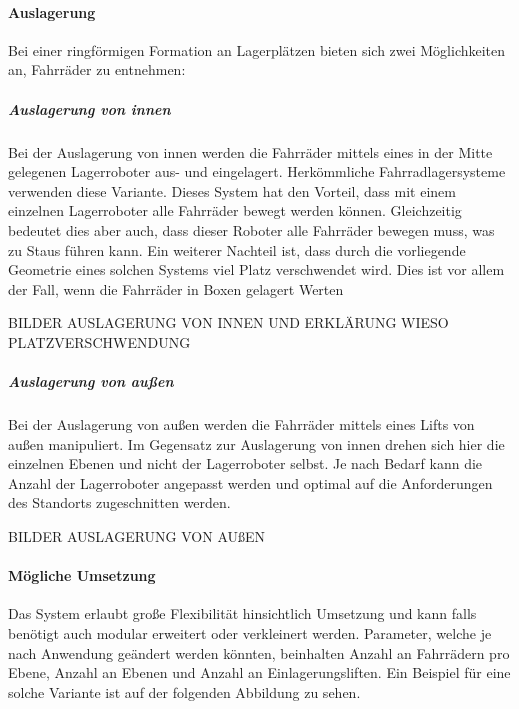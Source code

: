 \paragraph{Auslagerung} Bei einer ringförmigen Formation an Lagerplätzen bieten sich zwei Möglichkeiten an, Fahrräder zu entnehmen:

\subparagraph{Auslagerung von innen} Bei der Auslagerung von innen werden die Fahrräder mittels eines in der Mitte gelegenen Lagerroboter aus- und eingelagert. Herkömmliche Fahrradlagersysteme verwenden diese Variante. Dieses System hat den Vorteil, dass mit einem einzelnen Lagerroboter alle Fahrräder bewegt werden können. Gleichzeitig bedeutet dies aber auch, dass dieser Roboter alle Fahrräder bewegen muss, was zu Staus führen kann. Ein weiterer Nachteil ist, dass durch die vorliegende Geometrie eines solchen Systems viel Platz verschwendet wird. Dies ist vor allem der Fall, wenn die Fahrräder in Boxen gelagert Werten

BILDER AUSLAGERUNG VON INNEN UND ERKLÄRUNG WIESO PLATZVERSCHWENDUNG

\subparagraph{Auslagerung von außen} Bei der Auslagerung von außen werden die Fahrräder mittels eines Lifts von außen manipuliert. Im Gegensatz zur Auslagerung von innen drehen sich hier die einzelnen Ebenen und nicht der Lagerroboter selbst. Je nach Bedarf kann die Anzahl der Lagerroboter angepasst werden und optimal auf die Anforderungen des Standorts zugeschnitten werden.

BILDER AUSLAGERUNG VON AUßEN

\paragraph{Mögliche Umsetzung} Das System erlaubt große Flexibilität hinsichtlich Umsetzung und kann falls benötigt auch modular erweitert oder verkleinert werden. Parameter, welche je nach Anwendung geändert werden könnten, beinhalten Anzahl an Fahrrädern pro Ebene, Anzahl an Ebenen und Anzahl an Einlagerungsliften. Ein Beispiel für eine solche Variante ist auf der folgenden Abbildung zu sehen.

